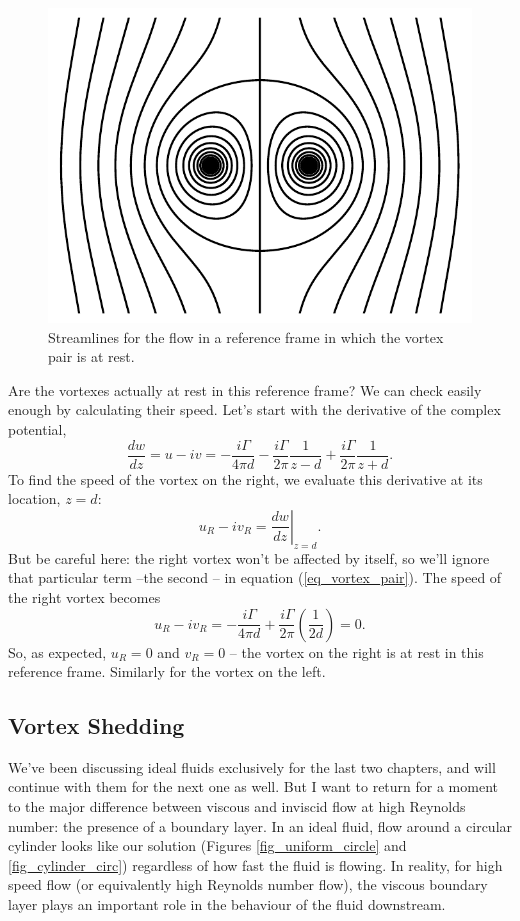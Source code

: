 \begin{figure}
\centering\includegraphics[width=0.7\linewidth]{Figures/Chapter4/fig_vortex_pair3}
\caption{Streamlines for the flow in a reference frame in which the vortex pair is at rest.}
\label{fig_vortex_pair3}
\end{figure}

Are the vortexes actually at rest in this reference frame?  We can check easily enough by calculating their speed.  Let's start with the derivative of the complex potential,
\begin{equation}
\label{eq_vortex_pair}
\frac{dw}{dz} = u - iv = -\frac{i\Gamma}{4 \pi d} - \frac{i\Gamma}{2\pi} \frac{1}{z-d} +  \frac{i\Gamma}{2\pi} \frac{1}{z+d}.
\end{equation}
To find the speed of the vortex on the right, we evaluate this derivative at its location, $z = d$:
\[
u_R - iv_R = \left. \frac{dw}{dz} \right|_{z=d}.
\]
But be careful here: the right vortex won't be affected by itself, so we'll ignore that particular term --the second -- in equation (\ref{eq_vortex_pair}).  The speed of the right vortex becomes
\[
u_R - iv_R = -\frac{i\Gamma}{4\pi d} + \frac{i\Gamma}{2\pi} \left( \frac{1}{2d} \right) = 0.
\]
So, as expected, $u_R = 0$ and $v_R = 0$ -- the vortex on the right is at rest in this reference frame.  Similarly for the vortex on the left.



\subsection{Vortex Shedding}

We've been discussing ideal fluids exclusively for the last two chapters, and will continue with them for the next one as well.  But I want to return for a moment to the major difference between viscous and inviscid flow at high Reynolds number: the presence of a boundary layer.  In an ideal fluid, flow around a circular cylinder looks like our solution (Figures \ref{fig_uniform_circle} and \ref{fig_cylinder_circ}) regardless of how fast the fluid is flowing.  In reality, for high speed flow (or equivalently high Reynolds number flow), the viscous boundary layer plays an important role in the behaviour of the fluid downstream.  

